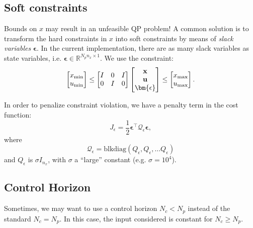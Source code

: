\documentclass[a4paper,12pt,fleqn]{article}
\newcommand{\nx}{n_x}
\newcommand{\varepsvec}{\bm{\epsilon}}
\newcommand{\varxvec}{\mathbf{x}}
\newcommand{\varuvec}{\mathbf{u}}
\newcommand{\slack}{\epsilon}
\newcommand{\Np}{{N_p}}
\newcommand{\Nc}{{N_c}}
\newcommand{\blkdiag}{\text{blkdiag}}
\begin{document}
\subsection{Soft constraints}
Bounds on $x$ may result in an unfeasible QP problem! A common solution
is to transform the hard constraints in $x$ into soft constraints by means of  \emph{slack variables} $\varepsvec$. 
In the current implementation, there are as many slack variables as state variables, i.e. $\varepsvec \in \mathbb{R}^{\Np\nx \times 1}$.
We use the constraint:
\begin{equation}
\begin{bmatrix}
 x_{\rm min}\\u_{\rm min}
\end{bmatrix}
\leq
\begin{bmatrix}
 I &0 &I\\
 0 &I & 0
\end{bmatrix}
\begin{bmatrix}
 \varxvec\\
 \varuvec\\
 \varepsvec
\end{bmatrix}
\leq
\begin{bmatrix}
 x_{\rm max}\\u_{\rm max}
\end{bmatrix}.
\end{equation}

In order to penalize constraint violation, we have a penalty term in the cost function:
\begin{equation}
 J_{\slack} = \frac{1}{2} \varepsvec^\top \mathcal{Q}_{\slack} \varepsvec,
\end{equation}
where 
\begin{equation}
\mathcal{Q}_{\slack} = \blkdiag(Q_{\slack}, Q_{\slack}, \dots Q_{\slack})
\end{equation}
and $Q_{\slack}$ is $\sigma I_{\nx}$, with $\sigma$ a ``large'' constant (e.g. $\sigma=10^4$).

\subsection{Control Horizon}
Sometimes, we may want to use a control horizon $\Nc < \Np$ instead of the standard $\Nc = \Np$. In this case, the input considered is constant for $\Nc \geq \Np$.
\end{document}
